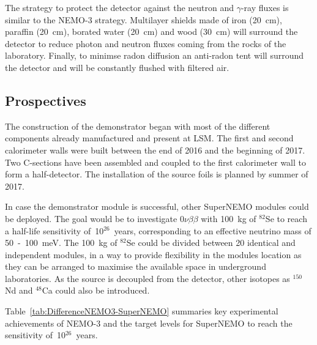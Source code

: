 \documentclass[main.tex]{subfiles}
\begin{document}
\NI The strategy to protect the detector against the neutron and $\gamma$-ray fluxes is similar to the NEMO-3 strategy. Multilayer shields made of iron (20~cm), paraffin (20~cm), borated water (20~cm) and wood (30~cm) will surround the detector to reduce photon and neutron fluxes coming from the rocks of the laboratory. Finally, to minimse radon diffusion an anti-radon tent will surround the detector and will be constantly flushed with filtered air.


\subsection{Prospectives}


\NI The construction of the demonstrator began with most of the different components already manufactured and present at LSM. The first and second calorimeter walls were built between the end of 2016 and the beginning of 2017. Two C-sections have been assembled and coupled to the first calorimeter wall to form a half-detector. The installation of the source foils is planned by summer of 2017.%

\bigskip


\NI In case the demonstrator module is successful, other SuperNEMO modules could be deployed. The goal would be to investigate 0$\nu\beta\beta$ with 100~kg of $^{\text{82}}$Se to reach a half-life sensitivity of~10$^{\text{26}}$~years, corresponding to an effective neutrino mass of 50~-~100~meV. The 100~kg of $^{\text{82}}$Se could be divided between 20 identical and independent modules, in a way to provide flexibility in the modules location as they can be arranged to maximise the available space in underground laboratories. As the source is decoupled from the detector, other isotopes as $^{\text{150}}$Nd and $^{\text{48}}$Ca could also be introduced.


\bigskip


\NI Table~\ref{tab:DifferenceNEMO3-SuperNEMO} summaries key experimental achievements of NEMO-3 and the target levels for SuperNEMO to reach the sensitivity of~10$^{\text{26}}$~years. 
\end{document}
